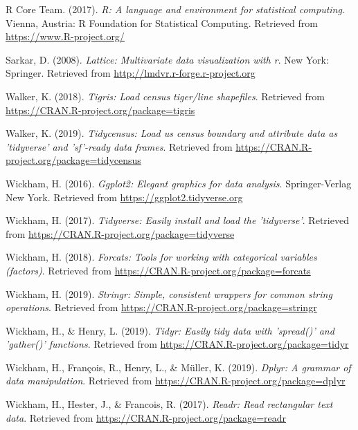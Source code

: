 \documentclass[man]{apa6}
\begin{document}
\hypertarget{ref-R-base}{}
R Core Team. (2017). \emph{R: A language and environment for statistical
computing}. Vienna, Austria: R Foundation for Statistical Computing.
Retrieved from \url{https://www.R-project.org/}

\hypertarget{ref-R-lattice}{}
Sarkar, D. (2008). \emph{Lattice: Multivariate data visualization with
r}. New York: Springer. Retrieved from
\url{http://lmdvr.r-forge.r-project.org}

\hypertarget{ref-R-tigris}{}
Walker, K. (2018). \emph{Tigris: Load census tiger/line shapefiles}.
Retrieved from \url{https://CRAN.R-project.org/package=tigris}

\hypertarget{ref-R-tidycensus}{}
Walker, K. (2019). \emph{Tidycensus: Load us census boundary and
attribute data as 'tidyverse' and 'sf'-ready data frames}. Retrieved
from \url{https://CRAN.R-project.org/package=tidycensus}

\hypertarget{ref-R-ggplot2}{}
Wickham, H. (2016). \emph{Ggplot2: Elegant graphics for data analysis}.
Springer-Verlag New York. Retrieved from
\url{https://ggplot2.tidyverse.org}

\hypertarget{ref-R-tidyverse}{}
Wickham, H. (2017). \emph{Tidyverse: Easily install and load the
'tidyverse'}. Retrieved from
\url{https://CRAN.R-project.org/package=tidyverse}

\hypertarget{ref-R-forcats}{}
Wickham, H. (2018). \emph{Forcats: Tools for working with categorical
variables (factors)}. Retrieved from
\url{https://CRAN.R-project.org/package=forcats}

\hypertarget{ref-R-stringr}{}
Wickham, H. (2019). \emph{Stringr: Simple, consistent wrappers for
common string operations}. Retrieved from
\url{https://CRAN.R-project.org/package=stringr}

\hypertarget{ref-R-tidyr}{}
Wickham, H., \& Henry, L. (2019). \emph{Tidyr: Easily tidy data with
'spread()' and 'gather()' functions}. Retrieved from
\url{https://CRAN.R-project.org/package=tidyr}

\hypertarget{ref-R-dplyr}{}
Wickham, H., François, R., Henry, L., \& Müller, K. (2019). \emph{Dplyr:
A grammar of data manipulation}. Retrieved from
\url{https://CRAN.R-project.org/package=dplyr}

\hypertarget{ref-R-readr}{}
Wickham, H., Hester, J., \& Francois, R. (2017). \emph{Readr: Read
rectangular text data}. Retrieved from
\url{https://CRAN.R-project.org/package=readr}

\endgroup
\end{document}
